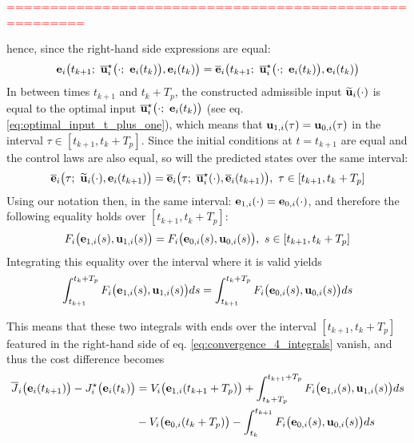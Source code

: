 \begin{gg_box}

\textcolor{red}{=======================================================}

hence, since the right-hand side expressions are equal:
\begin{align}
  \vect{e}_i\big(t_{k+1};\ \overline{\vect{u}}_i^{\star}\big(\cdot;\ \vect{e}_i(t_k)\big), \vect{e}_i(t_k)\big) =
    \overline{\vect{e}}_i\big(t_{k+1};\ \overline{\vect{u}}_i^{\star}\big(\cdot;\ \vect{e}_i(t_k)\big), \vect{e}_i(t_k)\big)
\end{align}
In between times $t_{k+1}$ and $t_k + T_p$, the constructed admissible input
$\widetilde{\bm{\mathbf{u}}}_i(\cdot)$ is equal to the optimal
input $\overline{\vect{u}}_i^{\star}\big(\cdot;\ \vect{e}_i(t_k)\big)$
(see eq. \ref{eq:optimal_input_t_plus_one}), which means that
$\bm{\mathbf{u}}_{1,i}(\tau) = \bm{\mathbf{u}}_{0,i}(\tau)$ in the interval $\tau \in [t_{k+1}, t_k + T_p]$.
Since the initial conditions at $t=t_{k+1}$ are equal and the control laws
are also equal, so will the predicted states over the same interval:
\begin{align}
  \overline{\bm{\mathbf{e}}}_i\big(\tau;\ \widetilde{\bm{\mathbf{u}}}_i(\cdot), \bm{\mathbf{e}}_i(t_{k+1})\big) =
  \overline{\bm{\mathbf{e}}}_i\big(\tau;\ \overline{\bm{\mathbf{u}}}_i^{\star}(\cdot), \overline{\bm{\mathbf{e}}}_i(t_{k+1})\big), \ \tau \in [t_{k+1}, t_k + T_p]
\end{align}
Using our notation then, in the same interval:
$\bm{\mathbf{e}}_{1,i}(\cdot) = \bm{\mathbf{e}}_{0,i}(\cdot)$, and therefore the following
equality holds over $[t_{k+1}, t_k + T_p]$:
\begin{align}
  F_i \big(\bm{\mathbf{e}}_{1,i}(s), \bm{\mathbf{u}}_{1,i} (s)\big) =
  F_i \big(\bm{\mathbf{e}}_{0,i}(s), \bm{\mathbf{u}}_{0,i} (s)\big),\ s \in [t_{k+1}, t_k + T_p]
\end{align}
Integrating this equality over the interval where it is valid yields
\begin{align}
  \int_{t_{k+1}}^{t_k + T_p}F_i \big(\bm{\mathbf{e}}_{1,i}(s), \bm{\mathbf{u}}_{1,i} (s)\big) ds =
  \int_{t_{k+1}}^{t_k + T_p}F_i \big(\bm{\mathbf{e}}_{0,i}(s), \bm{\mathbf{u}}_{0,i} (s)\big) ds
\end{align}
\end{gg_box}
This means that these two integrals with ends over the interval
$[t_{k+1}, t_k + T_p]$ featured in the right-hand side of eq.
\eqref{eq:convergence_4_integrals} vanish, and thus the cost difference becomes
\begin{align}
  \overline{J}_i\big(\bm{\mathbf{e}}_i(t_{k+1})\big) - J_i^{\star}\big(\bm{\mathbf{e}}_i(t_k)\big) &=
    V_i \big(\bm{\mathbf{e}}_{1,i} (t_{k+1} + T_p)\big)
    +\int_{t_k + T_p}^{t_{k+1} + T_p} F_i \big(\bm{\mathbf{e}}_{1,i}(s), \bm{\mathbf{u}}_{1,i} (s)\big) d s \\
    &-V_i \big(\bm{\mathbf{e}}_{0,i} (t_k + T_p)\big)
    -\int_{t_k}^{t_{k+1}} F_i \big(\bm{\mathbf{e}}_{0,i}(s), \bm{\mathbf{u}}_{0,i} (s)\big) d s
\label{eq:convergence_2_integrals}
\end{align}

